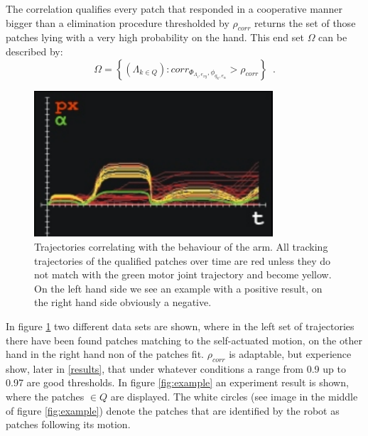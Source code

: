 The correlation qualifies every patch that responded in a cooperative manner bigger than a elimination procedure thresholded by $\rho_{corr}$ returns the set of those patches lying with a very high probability on the hand. This end set $\Omega$ can be described by:
%
\begin{equation}
\label{endset}
 \Omega = \left\lbrace \left( \Lambda_{k \in Q} \right): corr_{\Phi_{\Lambda_{i}, e_{xy}}, \phi_{q_{k}, e_{\alpha}}} > \rho_{corr} \right\rbrace \enspace .
\end{equation}
%
\begin{figure}[h]
	\begin{center}
		\includegraphics[width=3.5in]{imgs/method/correlation.pdf}
		\caption[Trajectories correlating with the behaviour of the arm. ]{Trajectories correlating with the behaviour of the arm. All tracking trajectories of the qualified patches over time are red unless they do not match with the green motor joint trajectory and become yellow. On the left hand side we see an example with a positive result, on the right hand side obviously a negative.}
		\label{fig:corr}
	\end{center}
\end{figure}
%
In figure \ref{fig:corr} two different data sets are shown, where in the left set of trajectories there have been found patches matching to the self-actuated motion, on the other hand in the right hand non of the patches fit. $\rho_{corr}$ is adaptable, but experience show, later in \ref{results}, that under whatever conditions a range from 0.9 up to 0.97 are good thresholds. In figure \ref{fig:example} an experiment result is shown, where the patches $\in Q$ are displayed. The white circles (see image in the middle of figure \ref{fig:example}) denote the patches that are identified by the robot as patches following its motion.
%
